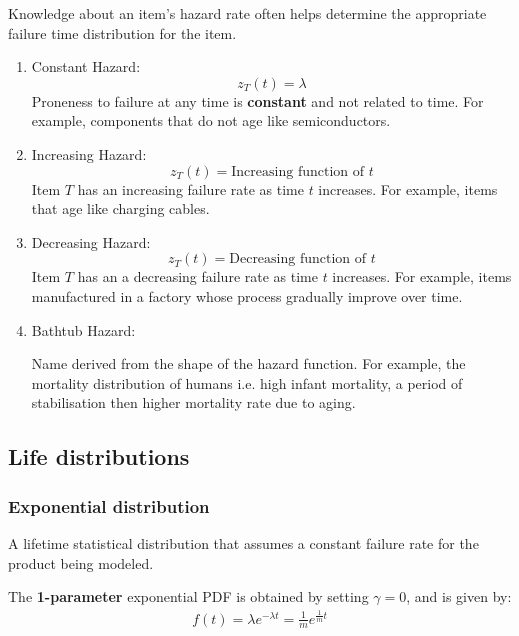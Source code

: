 \documentclass[10pt,a4paper]{article}
\begin{document}
Knowledge about an item’s hazard rate often helps determine the appropriate failure time distribution for the item.

\begin{enumerate}
    \item Constant Hazard:
    $$
        z_T(t) = \lambda
    $$
    Proneness to failure at any time is \textbf{constant} and not related to time. For example,
    components that do not age like semiconductors.

    \item Increasing Hazard: 
    $$
        z_T(t) = \text{Increasing function of }t
    $$
    Item $T$ has an increasing failure rate as time $t$ increases. For example, items that age like
    charging cables.

    \item Decreasing Hazard:
    $$
        z_T(t) = \text{Decreasing function of }t
    $$
    Item $T$ has an a decreasing failure rate as time $t$ increases. For example, items manufactured
   in a factory whose process gradually improve over time.

    \item Bathtub Hazard:
    
    Name derived from the shape of the hazard function. For example, the mortality distribution of
    humans i.e. high infant mortality, a period of stabilisation then higher mortality rate due to aging.    
\end{enumerate}

\pagebreak

\subsection{Life distributions}
\subsubsection{Exponential distribution}

A lifetime statistical distribution that assumes a constant failure rate for the product being
modeled. 

The \textbf{1-parameter} exponential PDF is obtained by setting $\gamma=0$, and is given by: 
\begin{align*}
    f(t)=\lambda e^{-\lambda t} = \frac{1}{m}e^{\frac{1}{m}t}
\end{align*}
\end{document}
